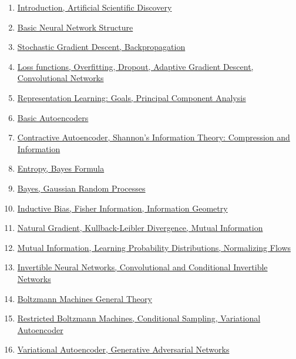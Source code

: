 \documentclass[11pt]{article}
\begin{document}
\begin{enumerate}
	\item \href{https://mp.weixin.qq.com/s/mzK9xnrxmOKGNyVy4fHocQ}{Introduction, Artificial Scientific Discovery} %
	\item \href{https://mp.weixin.qq.com/s/2ulUaFS__dZurnQ70kmWWQ}{Basic Neural Network Structure} %
	\item \href{https://mp.weixin.qq.com/s/94F0Q32cobXLfBuKeAsaog}{Stochastic Gradient Descent, Backpropagation} %
	\item \href{https://mp.weixin.qq.com/s/0gZzScsgtwV1WHjSSkziUw}{Loss functions, Overfitting, Dropout, Adaptive Gradient Descent, Convolutional Networks}%
	\item \href{https://mp.weixin.qq.com/s/ggM9hb298_Mxe8JKjRVI_Q}{Representation Learning: Goals, Principal Component Analysis}%
	\item \href{https://mp.weixin.qq.com/s/H61taZpRSTCBQqykXs-70g}{Basic Autoencoders}%
	\item \href{https://mp.weixin.qq.com/s/vyJukgqDgnBByaqotPtedA}{Contractive Autoencoder, Shannon's Information Theory: Compression and Information}%
	\item \href{https://mp.weixin.qq.com/s/WjIuCGRhNVE-BlhrHEbGWA}{Entropy, Bayes Formula}%
	\item \href{https://mp.weixin.qq.com/s/CBjRzYZOudjrSp1UTZlI4Q}{Bayes, Gaussian Random Processes}%
	\item \href{https://mp.weixin.qq.com/s/uan1k-91A49GFpcgM4F6kQ}{Inductive Bias, Fisher Information, Information Geometry}%
	\item \href{https://mp.weixin.qq.com/s/I6Aa-ZAFrye0qlfhZquOVQ}{Natural Gradient, Kullback-Leibler Divergence, Mutual Information}%
	\item \href{https://mp.weixin.qq.com/s/xZs7W0xHQQY_EpSMonqkWQ}{Mutual Information, Learning Probability Distributions, Normalizing Flows}%
	\item \href{https://mp.weixin.qq.com/s/XA5j3-sfTkUyrwEe0iF2fA}{Invertible Neural Networks, Convolutional and Conditional Invertible Networks}%
	\item \href{https://mp.weixin.qq.com/s/uENPzwLW7mau1l-jN8qsVA}{Boltzmann Machines General Theory}%
	\item \href{https://mp.weixin.qq.com/s/gELMbha7Xw8SAXZGKmsH4w}{Restricted Boltzmann Machines, Conditional Sampling, Variational Autoencoder}%
	\item \href{https://mp.weixin.qq.com/s/i_QjCpibflejgeUql1qojQ}{Variational Autoencoder, Generative Adversarial Networks}%

\end{enumerate}
\end{document}
